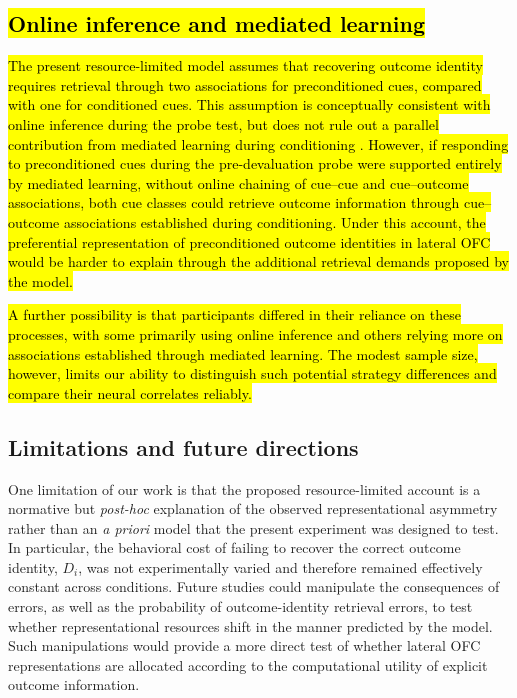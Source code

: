 \documentclass[9pt,twocolumn,twoside]{pnas-new}
\begin{document}
\subsection*{\hl{Online inference and mediated learning}}

\hl{The present resource-limited model assumes that recovering outcome identity requires retrieval through two associations for preconditioned cues, compared with one for conditioned cues. This assumption is conceptually consistent with online inference during the probe test, but does not rule out a parallel contribution from mediated learning during conditioning \mbox{\cite{RN512,RN507,RN509,wang2020targeted}}. However, if responding to preconditioned cues during the pre-devaluation probe were supported entirely by mediated learning, without online chaining of cue--cue and cue--outcome associations, both cue classes could retrieve outcome information through cue--outcome associations established during conditioning. Under this account, the preferential representation of preconditioned outcome identities in lateral OFC would be harder to explain through the additional retrieval demands proposed by the model.}

\hl{A further possibility is that participants differed in their reliance on these processes, with some primarily using online inference and others relying more on associations established through mediated learning. The modest sample size, however, limits our ability to distinguish such potential strategy differences and compare their neural correlates reliably.}


\subsection*{Limitations and future directions}

One limitation of our work is that the proposed resource-limited account is a normative but \textit{post-hoc} explanation of the observed representational asymmetry rather than an \textit{a priori} model that the present experiment was designed to test. In particular, the behavioral cost of failing to recover the correct outcome identity, \(D_i\), was not experimentally varied and therefore remained effectively constant across conditions. Future studies could manipulate the consequences of errors, as well as the probability of outcome-identity retrieval errors, to test whether representational resources shift in the manner predicted by the model. Such manipulations would provide a more direct test of whether lateral OFC representations are allocated according to the computational utility of explicit outcome information.
\end{document}

